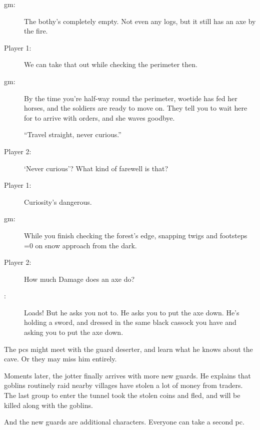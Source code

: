 \begin{multicols}{3}

\begin{description}\sf
  \item[\Gls{gm}:]
  The \gls{bothy}'s completely empty.
  Not even any logs, but it still has an axe by the fire.
  \item[Player 1:]
  We can take that out while checking the perimeter then.
  \item[\Gls{gm}:]
  By the time you're half-way round the perimeter, \gls{woetide} has fed her horses, and the \glspl{soldier} are ready to move on.
  They tell you to wait here for  to arrive with orders, and she waves goodbye.

  ``Travel straight, never curious.''
  \item[Player 2:]
  `Never curious'?
  What kind of farewell is that?
  \item[Player 1:]
  Curiosity's dangerous.

  \item[\Gls{gm}:]
  While you finish checking the forest's edge, snapping twigs and footsteps
  \ifnum\value{temperature}=0%
    on snow
  \fi%
  approach from the dark.
  \item[Player 2:]
  How much Damage does an axe do?
  \item[\Glsentrytext{gm}:]
  Loads!
  But he asks you not to.
  He asks you to put the axe down.
  He's holding a sword, and dressed in the same black cassock you have and asking you to put the axe down.
\end{description}

\bigLine\nobreak
\vspace{2em}
\noindent
The \glspl{pc} might meet with the \gls{guard} deserter, and learn what he knows about the cave.
Or they may miss him entirely.

Moments later, the \gls{jotter} finally arrives with more new \glspl{guard}.
He explains that goblins routinely raid nearby \glspl{village} have stolen a lot of money from traders.
The last group to enter the tunnel took the stolen \glspl{coin} and fled, and will be killed along with the goblins.

And the new \glspl{guard} are additional characters.
Everyone can take a second \gls{pc}.

\end{multicols}
